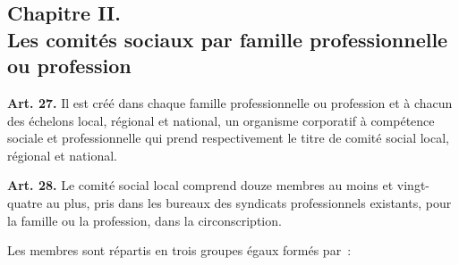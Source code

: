 \documentclass[french,twoside]{book} %
\newcommand{\labelchar}[1]{\textbf{\color{rubric} #1}}
\begin{document}
\subsection[Chapitre II. Les comités sociaux par famille professionnelle ou profession]{Chapitre II. \\
Les comités sociaux par famille professionnelle ou profession}
\noindent \labelchar{Art. 27.} Il est créé dans chaque famille professionnelle ou profession et à chacun des échelons local, régional et national, un organisme corporatif à compétence sociale et professionnelle qui prend respectivement le titre de comité social local, régional et national.\par
\bigbreak
\noindent \labelchar{Art. 28.} Le comité social local comprend douze membres au moins et vingt-quatre au plus, pris dans les bureaux des syndicats professionnels existants, pour la famille ou la profession, dans la circonscription.\par
Les membres sont répartis en trois groupes égaux formés par :\par
\end{document}
